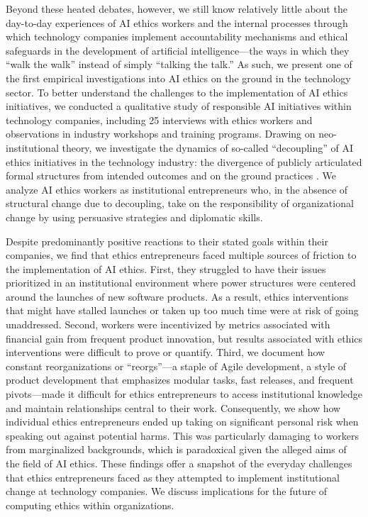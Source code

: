 \documentclass[sigconf]{acmart}
\begin{document}
Beyond these heated debates, however, we still know relatively little about the day-to-day experiences of AI ethics workers and the internal processes through which technology companies implement accountability mechanisms and ethical safeguards in the development of artificial intelligence—the ways in which they “walk the walk” instead of simply “talking the talk.” As such, we present one of the first empirical investigations into AI ethics on the ground in the technology sector. To better understand the challenges to the implementation of AI ethics initiatives, we conducted a qualitative study of responsible AI initiatives within technology companies, including 25 interviews with ethics workers and observations in industry workshops and training programs. Drawing on neo-institutional theory, we investigate the dynamics of so-called “decoupling” of AI ethics initiatives in the technology industry: the divergence of publicly articulated formal structures from intended outcomes and on the ground practices \cite{meyer_institutionalized_1977}. We analyze AI ethics workers as institutional entrepreneurs \cite{dimaggio_interest_1988} who, in the absence of structural change due to decoupling, take on the responsibility of organizational change by using persuasive strategies and diplomatic skills. 

Despite predominantly positive reactions to their stated goals within their companies, we find that ethics entrepreneurs faced multiple sources of friction to the implementation of AI ethics. First, they struggled to have their issues prioritized in an institutional environment where power structures were centered around the launches of new software products. As a result, ethics interventions that might have stalled launches or taken up too much time were at risk of going unaddressed. Second, workers were incentivized by metrics associated with financial gain from frequent product innovation, but results associated with ethics interventions were difficult to prove or quantify. Third, we document how constant reorganizations or “reorgs”—a staple of Agile development, a style of product development that emphasizes modular tasks, fast releases, and frequent pivots—made it difficult for ethics entrepreneurs to access institutional knowledge and maintain relationships central to their work. Consequently, we show how individual ethics entrepreneurs ended up taking on significant personal risk when speaking out against potential harms. This was  particularly damaging to workers from marginalized backgrounds, which is paradoxical given the alleged aims of the field of AI ethics. These findings offer a snapshot of the everyday challenges that ethics entrepreneurs faced as they attempted to implement institutional change at technology companies. We discuss implications for the future of computing ethics within organizations.
\end{document}
